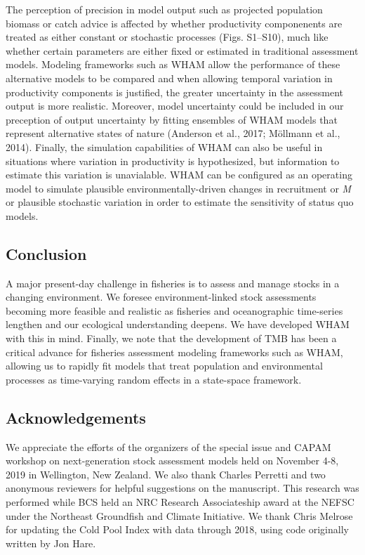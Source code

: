 \documentclass[]{article}
\begin{document}
The perception of precision in model output such as projected population
biomass or catch advice is affected by whether productivity componenents
are treated as either constant or stochastic processes (Figs. S1--S10),
much like whether certain parameters are either fixed or estimated in
traditional assessment models. Modeling frameworks such as WHAM allow
the performance of these alternative models to be compared and when
allowing temporal variation in productivity components is justified, the
greater uncertainty in the assessment output is more realistic.
Moreover, model uncertainty could be included in our preception of
output uncertainty by fitting ensembles of WHAM models that represent
alternative states of nature (Anderson et al., 2017; Möllmann et al.,
2014). Finally, the simulation capabilities of WHAM can also be useful
in situations where variation in productivity is hypothesized, but
information to estimate this variation is unavialable. WHAM can be
configured as an operating model to simulate plausible
environmentally-driven changes in recruitment or \emph{M} or plausible
stochastic variation in order to estimate the sensitivity of status quo
models.

\hypertarget{conclusion}{%
\subsection{Conclusion}\label{conclusion}}

A major present-day challenge in fisheries is to assess and manage
stocks in a changing environment. We foresee environment-linked stock
assessments becoming more feasible and realistic as fisheries and
oceanographic time-series lengthen and our ecological understanding
deepens. We have developed WHAM with this in mind. Finally, we note that
the development of TMB has been a critical advance for fisheries
assessment modeling frameworks such as WHAM, allowing us to rapidly fit
models that treat population and environmental processes as time-varying
random effects in a state-space framework.

\hypertarget{acknowledgements}{%
\subsection*{Acknowledgements}\label{acknowledgements}}

We appreciate the efforts of the organizers of the special issue and
CAPAM workshop on next-generation stock assessment models held on
November 4-8, 2019 in Wellington, New Zealand. We also thank Charles
Perretti and two anonymous reviewers for helpful suggestions on the
manuscript. This research was performed while BCS held an NRC Research
Associateship award at the NEFSC under the Northeast Groundfish and
Climate Initiative. We thank Chris Melrose for updating the Cold Pool
Index with data through 2018, using code originally written by Jon Hare.
\end{document}
